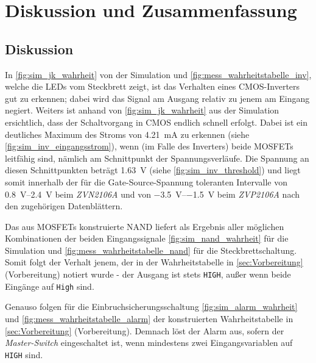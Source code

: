 \documentclass[12pt,english,ngerman]{scrartcl}
\begin{document}
\section{Diskussion und Zusammenfassung}\label{sec:Diskussion} 
\subsection{Diskussion}
In \autoref{fig:sim_jk_wahrheit} von der Simulation und
\autoref{fig:mess_wahrheitstabelle_inv}, welche die LEDs vom Steckbrett zeigt,
ist das Verhalten eines CMOS-Inverters gut zu erkennen; dabei wird das Signal
am Ausgang relativ zu jenem am Eingang negiert.
Weiters ist anhand von \autoref{fig:sim_jk_wahrheit} aus der Simulation ersichtlich, dass
der Schaltvorgang in CMOS endlich schnell erfolgt. Dabei ist ein deutliches
Maximum des Stroms von \SI{4,21}{\milli \ampere} zu erkennen (siehe \autoref{fig:sim_inv_eingangsstrom}), 
wenn (im Falle des Inverters) beide MOSFETs
leitfähig sind, nämlich am Schnittpunkt der Spannungsverläufe.
Die Spannung an diesen Schnittpunkten beträgt \SI{1,63}{\volt} 
(siehe \autoref{fig:sim_inv_threshold}) und liegt
somit innerhalb der für die Gate-Source-Spannung toleranten Intervalle
von \SIrange{0.8}{2.4}{\volt} beim \textit{ZVN2106A} und von
\SIrange{-3.5}{-1.5}{\volt} beim \textit{ZVP2106A} nach den zugehörigen Datenblättern.

Das aus MOSFETs konstruierte NAND liefert als Ergebnis aller möglichen
Kombinationen der beiden Eingangssignale \autoref{fig:sim_nand_wahrheit} für die Simulation
und \autoref{fig:mess_wahrheitstabelle_nand} für die Steckbrettschaltung.
Somit folgt der Verhalt jenem, der in der Wahrheitstabelle in \autoref{sec:Vorbereitung}
(Vorbereitung) notiert wurde - der Ausgang ist stets \texttt{HIGH}, außer wenn
beide Eingänge auf \texttt{High} sind.

Genauso folgen für die Einbruchsicherungsschaltung \autoref{fig:sim_alarm_wahrheit} 
und \autoref{fig:mess_wahrheitstabelle_alarm}
der konstruierten Wahrheitstabelle in \autoref{sec:Vorbereitung} (Vorbereitung).
Demnach löst der Alarm aus, sofern der \textit{Master-Switch} eingeschaltet ist, 
wenn mindestens
zwei Eingangsvariablen auf \texttt{HIGH} sind.
\end{document}
